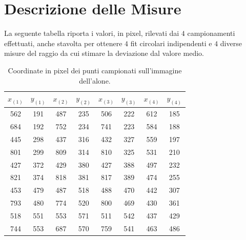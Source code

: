 \documentclass{report}[a4paper,11pt]
\begin{document}
\section{Descrizione delle Misure}
La seguente tabella riporta i valori, in pixel, rilevati dai $4$ campionamenti effettuati, anche stavolta per ottenere $4$ fit circolari indipendenti e $4$ diverse misure del raggio da cui stimare la deviazione dal valore medio.
\begin{table}[htb!]
  \begin{center}
	\begin{tabular}{cccccccc}
	\toprule
	$x_{(1)}$  & $y_{(1)}$  & $x_{(2)}$  & $y_{(2)}$  & $x_{(3)}$  & $y_{(3)}$ & $x_{(4)}$  & $y_{(4)}$ \\
	\midrule
	\midrule
	562 & 191 & 487 & 235 & 506 & 222 & 612 & 185 \\
	                                         
	684 & 192 & 752 & 234 & 741 & 223 & 584 & 188 \\
	                                         
	445 & 298 & 437 & 316 & 432 & 327 & 559 & 197 \\
	                                         
	801 & 299 & 809 & 314 & 810 & 325 & 531 & 210 \\
	                                         
	427 & 372 & 429 & 380 & 427 & 388 & 497 & 232 \\
	                                         
	821 & 374 & 818 & 381 & 817 & 389 & 474 & 255 \\
	                                         
	453 & 479 & 487 & 518 & 488 & 470 & 442 & 307 \\
	                                         
	793 & 480 & 774 & 520 & 800 & 469 & 430 & 361 \\
	                                         
	518 & 551 & 553 & 571 & 511 & 542 & 437 & 429 \\
	                                         
	744 & 553 & 687 & 570 & 759 & 541 & 463 & 486 \\
	\bottomrule
	\end{tabular}
  \end{center}
  \caption{Coordinate in pixel dei punti campionati sull'immagine dell'alone.}
\end{table}
\end{document}

